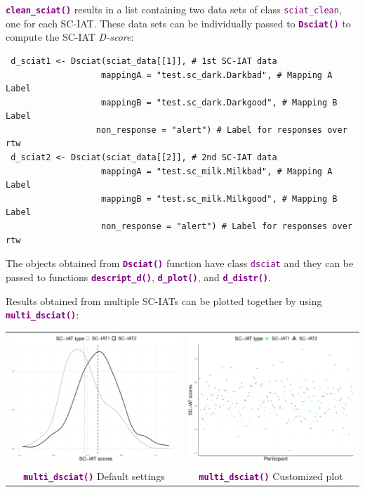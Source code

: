 \documentclass[a0,landscape]{a0poster}
\begin{document}
\begin{multicols*}{3}
 \textbf{\textcolor{purple}{\texttt{clean\_sciat()}}} results in a list containing two data sets of class \textcolor{purple}{\texttt{sciat\_clean}}, one for each SC-IAT. These data sets can be individually passed to \textbf{\textcolor{purple}{\texttt{Dsciat()}}} to compute the SC-IAT \emph{D-score}: 
\vspace{.4cm}
\begin{lstlisting}
 d_sciat1 <- Dsciat(sciat_data[[1]], # 1st SC-IAT data
                   mappingA = "test.sc_dark.Darkbad", # Mapping A Label
                   mappingB = "test.sc_dark.Darkgood", # Mapping B Label
                  non_response = "alert") # Label for responses over rtw
 d_sciat2 <- Dsciat(sciat_data[[2]], # 2nd SC-IAT data
                   mappingA = "test.sc_milk.Milkbad", # Mapping A Label
                   mappingB = "test.sc_milk.Milkgood", # Mapping B Label
                   non_response = "alert") # Label for responses over rtw
\end{lstlisting}	

The objects obtained from \textbf{\textcolor{purple}{\texttt{Dsciat()}}} function have class \textcolor{purple}{\texttt{dsciat}} and they can be passed to functions \textbf{\textcolor{purple}{\texttt{descript\_d()}}}, \textbf{\textcolor{purple}{\texttt{d\_plot()}}}, and \textbf{\textcolor{purple}{\texttt{d\_distr()}}}. 

Results obtained from multiple SC-IATs can be plotted together by using \textbf{\textcolor{purple}{\texttt{multi\_dsciat()}}}: 

		\vspace{.4cm}
\begin{tabular}{c c}
	\includegraphics[width=0.45\linewidth]{sciatDefault.pdf}
	&
	\includegraphics[width=0.45\linewidth]{multiSciatPoints.pdf} \\
	\textbf{\textcolor{purple}{\texttt{multi\_dsciat()}}}  Default settings & \textbf{\textcolor{purple}{\texttt{multi\_dsciat()}}} Customized plot\\
\end{tabular}


\end{multicols*}
\end{document}
